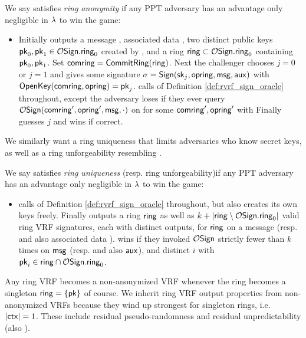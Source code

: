 \begin{definition}
We say \rVRF satisfies {\em ring anonymity} if
any PPT adversary \adv has an advantage only
 negligible in $\lambda$ to win the game:
\begin{itemize}
\item[]
 Initially \adv outputs a message \msg, associated data \aux,
 two distinct public keys $\mathsf{pk}_0,\mathsf{pk}_1 \in \mathcal{O}\mathsf{Sign}.\mathsf{ring}_0$ created by ,
 and a ring $\mathsf{ring} \subset \mathcal{O}\mathsf{Sign}.\mathsf{ring}_0$ containing $\mathsf{pk}_0,\mathsf{pk}_1$.
 Set $\mathsf{comring} = {\mathsf{CommitRing}}(\mathsf{ring})$.
 Next the challenger chooses $j=0$ or $j=1$ and gives
  \adv some signature $\sigma = {\mathsf{Sign}}(\mathsf{sk}_j,\mathsf{opring},\mathsf{msg},\mathsf{aux})$ with ${\mathsf{OpenKey}}(\mathsf{comring},\mathsf{opring}) = \mathsf{pk}_j$.
 \adv calls  of Definition \ref{def:rvrf_sign_oracle} throughout,
 except the adversary \adv loses if they ever query $\mathcal{O}\mathsf{Sign}(\mathsf{comring}',\mathsf{opring}',\mathsf{msg},\cdot)$
 on \msg for some $\mathsf{comring}',\mathsf{opring}'$ with
 \def\tmp{\OpenKey(\comring',\openring') \in \{ \pk_0, \pk_1 \}}
 \eprint{$\tmp$.}{$$ \mathperiod $$}
 Finally \adv guesses $j$ and wins if correct.
\end{itemize}
\end{definition}

We similarly want a ring uniqueness that limits adversaries who know secret keys,
as well as a ring unforgeability resembling \cite[pp. 7 Def. 7]{cryptoeprint:2005:304}. %

\begin{definition}
We say \rVRF satisfies {\em ring uniqueness} (resp. ring unforgeability)if
any PPT adversary \adv has an advantage only
 negligible in $\lambda$ to win the game:
\begin{itemize}
\item[]
 \adv calls  of Definition \ref{def:rvrf_sign_oracle} throughout,
 but also creates its own keys freely.
 Finally \adv outputs a ring $\mathsf{ring}$ as well as
 $k + |\mathsf{ring} \setminus \mathcal{O}\mathsf{Sign}.\mathsf{ring}_0|$ valid ring VRF signatures,
  each with distinct outputs,    %
 for $\mathsf{ring}$ on a message \msg (resp. and also associated data \aux).
 \adv wins if they invoked $\mathcal{O}\mathsf{Sign}$ strictly fewer than $k$ times
 on $\mathsf{msg}$ (resp. and also $\mathsf{aux}$), and
  distinct $i$ with $\mathsf{pk}_i \in \mathsf{ring} \cap \mathcal{O}\mathsf{Sign}.\mathsf{ring}_0$.
\end{itemize}
\end{definition}
 
Any ring VRF becomes a non-anonymized VRF whenever
 the ring becomes a singleton $\mathsf{ring} = \{ \mathsf{pk} \}$ of course.
We inherit ring VRF output properties from non-anonymized VRFs
because they wind up strongest for singleton rings, i.e. $|\mathsf{ctx}| = 1$.
These include 
 residual pseudo-randomness \cite[Def. VRF (3) \S3.2, pp. 4]{vrf_micali} and
 residual unpredictability \cite[Def. VUF (3) \S3.2, pp. 5]{vrf_micali}
  (also \cite[Def. 4, pp. 8]{agg_dkg}).





